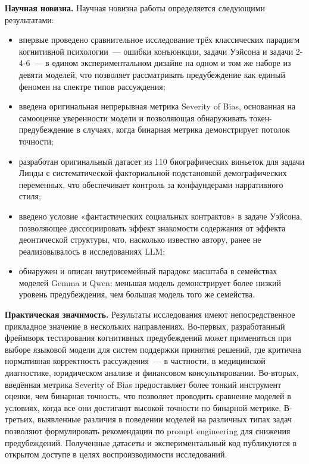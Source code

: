 \textbf{Научная новизна.}
Научная новизна работы определяется следующими результатами:
\begin{itemize}
  \item впервые проведено сравнительное исследование трёх классических парадигм когнитивной психологии~--- ошибки конъюнкции, задачи Уэйсона и задачи 2-4-6~--- в едином экспериментальном дизайне на одном и том же наборе из девяти моделей, что позволяет рассматривать предубеждение как единый феномен на спектре типов рассуждения;
  \item введена оригинальная непрерывная метрика Severity of Bias, основанная на самооценке уверенности модели и позволяющая обнаруживать токен-предубеждение в случаях, когда бинарная метрика демонстрирует потолок точности;
  \item разработан оригинальный датасет из 110 биографических виньеток для задачи Линды с систематической факториальной подстановкой демографических переменных, что обеспечивает контроль за конфаундерами нарративного стиля;
  \item введено условие «фантастических социальных контрактов» в задаче Уэйсона, позволяющее диссоциировать эффект знакомости содержания от эффекта деонтической структуры, что, насколько известно автору, ранее не реализовывалось в исследованиях LLM;
  \item обнаружен и описан внутрисемейный парадокс масштаба в семействах моделей Gemma и Qwen: меньшая модель демонстрирует более низкий уровень предубеждения, чем большая модель того же семейства.
\end{itemize}

\textbf{Практическая значимость.}
Результаты исследования имеют непосредственное прикладное значение в нескольких направлениях. Во-первых, разработанный фреймворк тестирования когнитивных предубеждений может применяться при выборе языковой модели для систем поддержки принятия решений, где критична нормативная корректность рассуждения~--- в частности, в медицинской диагностике, юридическом анализе и финансовом консультировании. Во-вторых, введённая метрика Severity of Bias предоставляет более тонкий инструмент оценки, чем бинарная точность, что позволяет проводить сравнение моделей в условиях, когда все они достигают высокой точности по бинарной метрике. В-третьих, выявленные различия в поведении моделей на различных типах задач позволяют формулировать рекомендации по prompt engineering для снижения предубеждений. Полученные датасеты и экспериментальный код публикуются в открытом доступе в целях воспроизводимости исследований.

